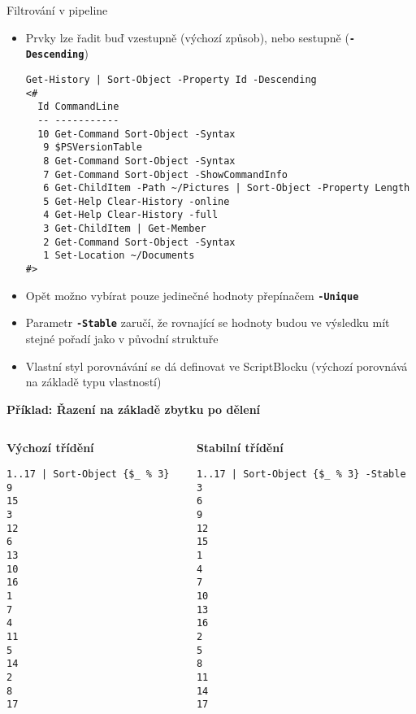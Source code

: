 \documentclass[main.tex]{subfiles}
\begin{document}
\begin{frame}{Filtrování v pipeline}
\begin{itemize}
\begin{verbatim}
  Mode                 LastWriteTime         Length Name
  ----                 -------------         ------ ----
  d----           5/23/2020  3:23 PM                alacritty
  d----            5/9/2020 11:03 PM                asciinema
  d----           3/28/2020  3:00 PM                autostart
  d----            5/3/2020  2:24 PM                blender
  d----           4/21/2020 11:03 PM                calcurse
#>
    \end{verbatim}
  \item Prvky lze řadit buď vzestupně (výchozí způsob), nebo sestupně (\textbf{\texttt{-Descending}})\vspace{3mm}
    \begin{verbatim}
Get-History | Sort-Object -Property Id -Descending
<#
  Id CommandLine
  -- -----------
  10 Get-Command Sort-Object -Syntax
   9 $PSVersionTable
   8 Get-Command Sort-Object -Syntax
   7 Get-Command Sort-Object -ShowCommandInfo
   6 Get-ChildItem -Path ~/Pictures | Sort-Object -Property Length
   5 Get-Help Clear-History -online
   4 Get-Help Clear-History -full
   3 Get-ChildItem | Get-Member
   2 Get-Command Sort-Object -Syntax
   1 Set-Location ~/Documents
#>
  \end{verbatim}
\framebreak
  \item Opět možno vybírat pouze jedinečné hodnoty přepínačem \textbf{\texttt{-Unique}}
  \item Parametr \textbf{\texttt{-Stable}} zaručí, že rovnající se hodnoty budou ve výsledku mít stejné pořadí jako v původní struktuře
  \item Vlastní styl porovnávání se dá definovat ve ScriptBlocku (výchozí porovnává na základě typu vlastností)
\end{itemize}
\framebreak
\textbf{Příklad: Řazení na základě zbytku po dělení}
\begin{columns}[t]
  \begin{column}{0.47\textwidth}
    \textbf{Výchozí třídění}
  \scriptsize
    \begin{verbatim}
1..17 | Sort-Object {$_ % 3}
9
15
3
12
6
13
10
16
1
7
4
11
5
14
2
8
17
\end{verbatim}
  \end{column}
  \begin{column}{0.5\textwidth}
    \textbf{Stabilní třídění}
  \scriptsize
    \begin{verbatim}
1..17 | Sort-Object {$_ % 3} -Stable
3
6
9
12
15
1
4
7
10
13
16
2
5
8
11
14
17
\end{verbatim}
  \end{column}
\end{columns}
\end{frame}
\end{document}

